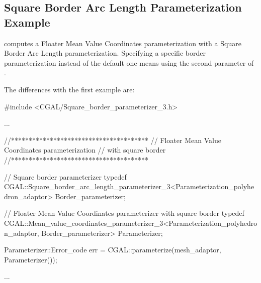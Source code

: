 \subsection{Square Border Arc Length Parameterization Example}

 computes a Floater Mean Value Coordinates
parameterization with a Square Border Arc Length parameterization.
Specifying a specific border parameterization
instead of the default one means using the second parameter of
.

The differences with the first example  are:

\begin{ccExampleCode}

#include <CGAL/Square_border_parameterizer_3.h>

...

//***************************************
// Floater Mean Value Coordinates parameterization
// with square border
//***************************************

// Square border parameterizer
typedef CGAL::Square_border_arc_length_parameterizer_3<Parameterization_polyhedron_adaptor>
                                                        Border_parameterizer;

// Floater Mean Value Coordinates parameterizer with square border
typedef CGAL::Mean_value_coordinates_parameterizer_3<Parameterization_polyhedron_adaptor,
                                                        Border_parameterizer>
                                                    Parameterizer;

Parameterizer::Error_code err = CGAL::parameterize(mesh_adaptor, Parameterizer());

...

\end{ccExampleCode}

